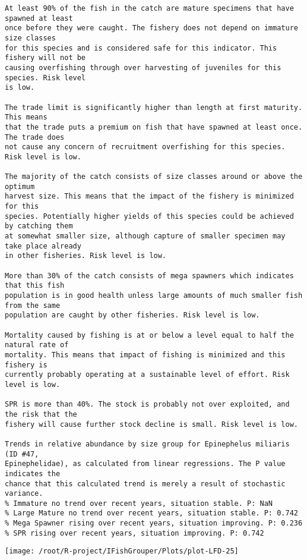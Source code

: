 \documentclass{report}\usepackage[]{graphicx}\usepackage[]{color}
\makeatletter
\def\maxwidth{ %
  \ifdim\Gin@nat@width>\linewidth
    \linewidth
  \else
    \Gin@nat@width
  \fi
}
\newenvironment{kframe}{%
 \def\at@end@of@kframe{}%
 \ifinner\ifhmode%
  \def\at@end@of@kframe{\end{minipage}}%
  \begin{minipage}{\columnwidth}%
 \fi\fi%
 \def\FrameCommand##1{\hskip\@totalleftmargin \hskip-\fboxsep
 \colorbox{shadecolor}{##1}\hskip-\fboxsep
     \hskip-\linewidth \hskip-\@totalleftmargin \hskip\columnwidth}%
 \MakeFramed {\advance\hsize-\width
   \@totalleftmargin\z@ \linewidth\hsize
   \@setminipage}}%
 {\par\unskip\endMakeFramed%
 \at@end@of@kframe}
\newenvironment{knitrout}{}{} %
\makeatother
\begin{document}
\begin{knitrout}
\begin{kframe}
\begin{verbatim}
At least 90% of the fish in the catch are mature specimens that have spawned at least
once before they were caught. The fishery does not depend on immature size classes
for this species and is considered safe for this indicator. This fishery will not be
causing overfishing through over harvesting of juveniles for this species. Risk level
is low.

The trade limit is significantly higher than length at first maturity.  This means
that the trade puts a premium on fish that have spawned at least once. The trade does
not cause any concern of recruitment overfishing for this species. Risk level is low.

The majority of the catch consists of size classes around or above the optimum
harvest size. This means that the impact of the fishery is minimized for this
species. Potentially higher yields of this species could be achieved by catching them
at somewhat smaller size, although capture of smaller specimen may take place already
in other fisheries. Risk level is low.

More than 30% of the catch consists of mega spawners which indicates that this fish
population is in good health unless large amounts of much smaller fish from the same
population are caught by other fisheries. Risk level is low.
 
Mortality caused by fishing is at or below a level equal to half the natural rate of
mortality. This means that impact of fishing is minimized and this fishery is
currently probably operating at a sustainable level of effort. Risk level is low.
 
SPR is more than 40%. The stock is probably not over exploited, and the risk that the
fishery will cause further stock decline is small. Risk level is low.
 
Trends in relative abundance by size group for Epinephelus miliaris (ID #47,
Epinephelidae), as calculated from linear regressions. The P value indicates the
chance that this calculated trend is merely a result of stochastic variance.
% Immature no trend over recent years, situation stable. P: NaN
% Large Mature no trend over recent years, situation stable. P: 0.742
% Mega Spawner rising over recent years, situation improving. P: 0.236
% SPR rising over recent years, situation improving. P: 0.742
\end{verbatim}
\end{kframe}
\texttt{[image: /root/R-project/IFishGrouper/Plots/plot-LFD-25]} 


\end{knitrout}
\end{document}
